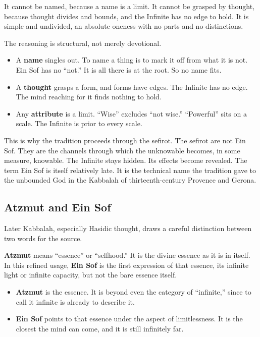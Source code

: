 It cannot be named, because a name is a limit. It cannot be grasped by thought,
because thought divides and bounds, and the Infinite has no edge to hold. It is
simple and undivided, an absolute oneness with no parts and no distinctions.

The reasoning is structural, not merely devotional.

\begin{itemize}
 \item A \textbf{name} singles out. To name a thing is to mark it off from what it
 is not. Ein Sof has no \enquote{not.} It is all there is at the root. So no
 name fits.
 \item A \textbf{thought} grasps a form, and forms have edges. The Infinite has no
 edge. The mind reaching for it finds nothing to hold.
 \item Any \textbf{attribute} is a limit. \enquote{Wise} excludes \enquote{not
 wise.} \enquote{Powerful} sits on a scale. The Infinite is prior to every
 scale.
\end{itemize}

This is why the tradition proceeds through the sefirot. The sefirot are not Ein Sof.
They are the channels through which the unknowable becomes, in some measure,
knowable. The Infinite stays hidden. Its effects become revealed. The term Ein Sof
is itself relatively late. It is the technical name the tradition gave to the
unbounded God in the Kabbalah of thirteenth-century Provence and Gerona.

\subsection{Atzmut and Ein Sof}

Later Kabbalah, especially Hasidic thought, draws a careful distinction between two
words for the source.

\textbf{Atzmut} means \enquote{essence} or \enquote{selfhood.} It is the divine
essence as it is in itself. In this refined usage, \textbf{Ein Sof} is the first
expression of that essence, its infinite light or infinite capacity, but not the
bare essence itself.

\begin{itemize}
 \item \textbf{Atzmut} is the essence. It is beyond even the category of
 \enquote{infinite,} since to call it infinite is already to describe it.
 \item \textbf{Ein Sof} points to that essence under the aspect of limitlessness.
 It is the closest the mind can come, and it is still infinitely far.
\end{itemize}

